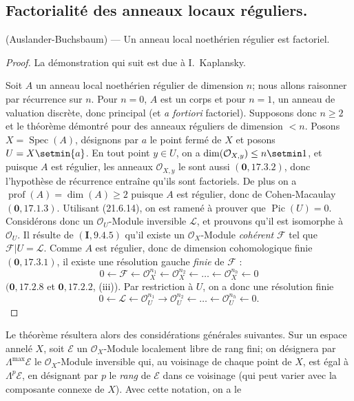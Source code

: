 \subsection{Factorialité des anneaux locaux réguliers.}
\label{IV.21.11}

\begin{theorem}[21.11.1]
\label{IV.21.11.1}
\textup{(Auslander-Buchsbaum)} ---
Un anneau local noethérien régulier est factoriel.
\end{theorem}

\begin{proof}
La démonstration qui suit est due à I.~Kaplansky.

Soit $A$ un anneau local noethérien régulier de dimension $n$; nous allons raisonner
par récurrence sur $n$. Pour $n=0$, $A$ est un corps et pour $n=1$, un anneau de
valuation discrète, donc principal (et \emph{a fortiori} factoriel). Supposons donc
$n\geq2$ et le théorème démontré pour des anneaux réguliers de dimension $<n$.
Posons $X=\operatorname{Spec}(A)$, désignons par $a$ le point fermé de $X$ et posons
$U=X\setmin\{a\}$. En tout point $y\in U$, on a
$\dim(\mathcal O_{X,y})\leq n\setmin 1$, et puisque $A$ est régulier, les anneaux
$\mathcal O_{X,y}$ le sont aussi $(\mathbf 0, 17.3.2)$, donc l'hypothèse de
récurrence entraîne qu'ils sont factoriels. De plus on a
$\operatorname{prof}(A)=\dim(A)\geq2$ puisque $A$ est régulier, donc de
Cohen-Macaulay $(\mathbf 0, 17.1.3)$.
Utilisant (21.6.14), on est ramené à prouver que $\operatorname{Pic}(U)=0$.
Considérons donc un $\mathcal O_U$-Module inversible $\mathscr L$, et prouvons qu'il
est isomorphe à $\mathcal O_U$. Il résulte de $(\mathbf I, 9.4.5)$ qu'il existe un
$\mathcal O_X$-Module \emph{cohérent} $\mathscr F$ tel que
$\mathscr F|U=\mathscr L$. Comme $A$ est régulier, donc de dimension cohomologique
finie $(\mathbf 0, 17.3.1)$, il existe une résolution gauche \emph{finie} de
$\mathscr F$ :
\[
  0\leftarrow\mathscr F\leftarrow\mathcal O_X^{n_1}
  \leftarrow\mathcal O_X^{n_2}\leftarrow\ldots
  \leftarrow\mathcal O_X^{n_h}\leftarrow0
\]
$(\mathbf 0, 17.2.8$ et $\mathbf 0, 17.2.2$, (iii)). Par restriction à $U$, on a
donc une résolution finie
\[
\label{IV.21.11.1.1}
  0\leftarrow\mathscr L\leftarrow\mathcal O_U^{n_1}
  \rightarrow\mathcal O_U^{n_2}\leftarrow\ldots
  \leftarrow\mathcal O_U^{n_h}\leftarrow0.
  \tag{21.11.1.1}
\]
\end{proof}

Le théorème résultera alors des considérations générales suivantes. Sur un espace
annelé $X$, soit $\mathscr E$ un $\mathcal O_X$-Module localement libre de rang fini;
on désignera par $\Lambda^{\max}\mathscr E$ le $\mathcal O_X$-Module inversible qui,
au voisinage de chaque point de $X$, est égal à $\Lambda^p\mathscr E$, en désignant
par $p$ le \emph{rang} de $\mathscr E$ dans ce voisinage (qui peut varier avec la composante
connexe de $X$). Avec cette notation, on a le

